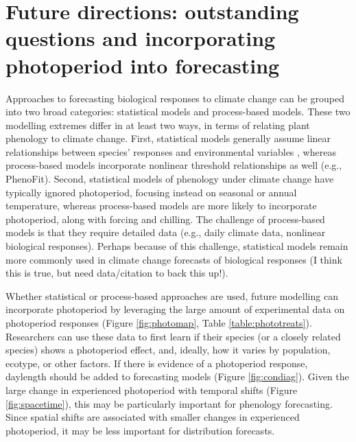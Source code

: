 \documentclass{article}
\begin{document}
\section*{Future directions: outstanding questions and incorporating photoperiod into forecasting}
\par Approaches to forecasting biological responses to climate change can be grouped into two broad categories: statistical models and process-based models. %
These two modelling extremes differ in at least two ways, in terms of relating plant phenology to climate change. First, statistical models generally assume linear relationships between species' responses and environmental variables \citep[e.g., EXAMPLES][]{flynn2018}, whereas process-based models incorporate nonlinear threshold relationships as well (e.g., PhenoFit). Second, statistical models of phenology under climate change have typically ignored photoperiod, focusing instead on seasonal or annual temperature,%
whereas process-based models are more likely to incorporate photoperiod, along with forcing and chilling. The challenge of process-based models is that they require detailed data (e.g., daily climate data, nonlinear biological responses). Perhaps because of this challenge, statistical models remain more commonly used in climate change forecasts of biological responses (I think this is true, but need data/citation to back this up!). %
\par Whether statistical or process-based approaches are used, future modelling can incorporate photoperiod by leveraging the large amount of experimental data on photoperiod responses (Figure \ref{fig:photomap}, Table \ref{table:phototreats}). Researchers can use these data to first learn if their species (or a closely related species) shows a photoperiod effect, and, ideally, how it varies by population, ecotype, or other factors. If there is evidence of a photoperiod response, daylength should be added to forecasting models (Figure \ref{fig:condiag}). Given the large change in experienced photoperiod with temporal shifts (Figure \ref{fig:spacetime}), this may be particularly important for phenology forecasting. Since spatial shifts are associated with smaller changes in experienced photoperiod, it may be less important for distribution forecasts.
\end{document}
